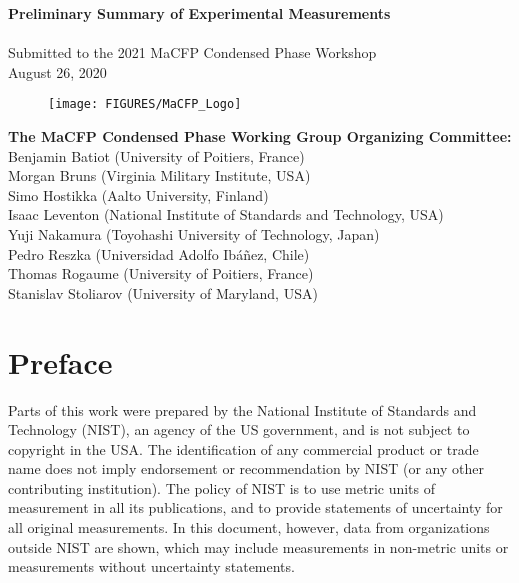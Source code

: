 \documentclass{book}
\begin{document}


\pagestyle{empty}

\vspace*{2in}

\begin{center}
{\bf Preliminary Summary of Experimental Measurements} \\
\hspace{1in} \\
Submitted to the 2021 MaCFP Condensed Phase Workshop \\
August 26, 2020 \\
\end{center}

\begin{figure}
  \centering
  \texttt{[image: FIGURES/MaCFP\_Logo]}
  \label{Cover_Image}
\end{figure}

\vfill

\begin{flushright}
{\bf The MaCFP Condensed Phase Working Group Organizing Committee:} \\
Benjamin Batiot (University of Poitiers, France) \\
Morgan Bruns (Virginia Military Institute, USA) \\
Simo Hostikka (Aalto University, Finland) \\
Isaac Leventon (National Institute of Standards and Technology, USA) \\
Yuji Nakamura (Toyohashi University of Technology, Japan) \\
Pedro Reszka (Universidad Adolfo Ibáñez, Chile) \\
Thomas Rogaume (University of Poitiers, France) \\
Stanislav Stoliarov (University of Maryland, USA)
\end{flushright}

\newpage

\frontmatter


\chapter{Preface}

Parts of this work were prepared by the National Institute of Standards and Technology (NIST), an agency of the US government, and is not subject to copyright in the USA. The identification of any commercial product or trade name does not imply endorsement or recommendation by NIST (or any other contributing institution). The policy of NIST is to use metric units of measurement in all its publications, and to provide statements of uncertainty for all original measurements. In this document, however, data from organizations outside NIST are shown, which may include measurements in non-metric units or measurements without uncertainty statements.
\end{document}
